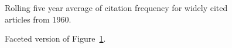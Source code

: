 \documentclass[
  10pt,
  letterpaper,
  DIV=11,
  numbers=noendperiod,
  twoside]{scrartcl}
\begin{document}
\begin{figure}


\caption{\label{fig-citation-spaghetti-1960}Rolling five year average of
citation frequency for widely cited articles from 1960.}

\end{figure}%

\begin{figure}


\caption{\label{fig-citation-facet-1960}Faceted version of
Figure~\ref{fig-citation-spaghetti-1960}.}

\end{figure}%
\end{document}
